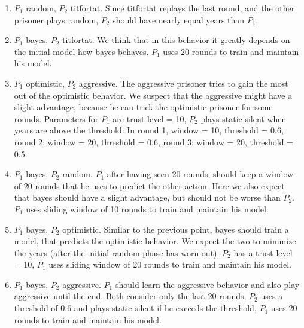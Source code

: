 \documentclass{acm_proc_article-sp}
\begin{document}
\begin{enumerate}
	\item $P_1$ random, $P_2$ titfortat. Since titfortat replays the last round, and the
    other prisoner plays random, $P_2$ should have nearly equal years than $P_1$.
    \label{item:p1random-p2titfortat}
    \item $P_1$ bayes, $P_2$ titfortat. We think that in this behavior it greatly depends
    on the initial model how bayes behaves. $P_1$ uses 20 rounds to train and maintain his model.

	\item $P_1$ optimistic, $P_2$ aggressive. The aggressive prisoner tries to gain the
      most out of the optimistic behavior. We suspect that the aggressive might have a slight advantage, because he can trick the optimistic prisoner for some rounds.
      Parameters for $P_1$ are trust level = 10, $P_2$ plays static silent when years are above the threshold. In round 1, window = 10, threshold = 0.6, round 2: window = 20, threshold = 0.6,
      round 3: window = 20, threshold = 0.5.
    \item $P_1$ bayes, $P_2$ random. $P_1$ after having seen 20 rounds, should keep a window of 20 rounds that he uses to predict the other action. Here we also expect that bayes should have a slight advantage, but should not be worse than $P_2$.
    $P_1$ uses sliding window of 10 rounds to train and maintain his model.
    \item $P_1$ bayes, $P_2$ optimistic. Similar to the previous point, bayes should train
    a model, that predicts the optimistic behavior. We expect the two to minimize the years (after the initial random phase has worn out).
    $P_2$ has a trust level = 10, $P_1$ uses sliding window of 20 rounds to train and maintain his model.
    \item $P_1$ bayes, $P_2$ aggressive. $P_1$ should learn the aggressive behavior and also
    play aggressive until the end.
    Both consider only the last 20 rounds, $P_2$ uses a threshold of 0.6 and plays static silent if he exceeds the threshold, $P_1$ uses 20 rounds to train and maintain his model.
\end{enumerate}
\end{document}
